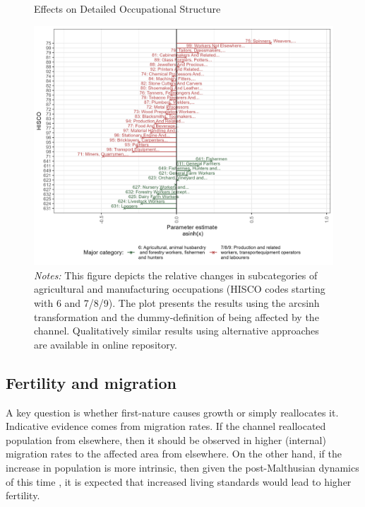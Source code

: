 \documentclass[11pt]{article}
\begin{document}
\begin{figure}[h]
\begin{center}
  \caption{\label{fig:mech_occ2} Effects on Detailed Occupational Structure}
  \includegraphics[width=1\textwidth]{Plots/Mechanism/Detailed6789/Dummy_asi.png}
  \parbox{0.9\textwidth}{
  \caption*{\footnotesize \textit{Notes:} This figure depicts the relative changes in subcategories of agricultural and manufacturing occupations (HISCO codes starting with 6 and 7/8/9). The plot presents the results using the arcsinh transformation and the dummy-definition of being affected by the channel. Qualitatively similar results using alternative approaches are available in online repository.}
}
\end{center}
\end{figure}

\FloatBarrier
\subsection{Fertility and migration}
A key question is whether first-nature causes growth or simply reallocates it. Indicative evidence comes from migration rates. If the channel reallocated population from elsewhere, then it should be observed in higher (internal) migration rates to the affected area from elsewhere. On the other hand, if the increase in population is more intrinsic, then given the post-Malthusian dynamics of this time \citep{Jensen2022, Klemp2016}, it is expected that increased living standards would lead to higher fertility.
\end{document}
